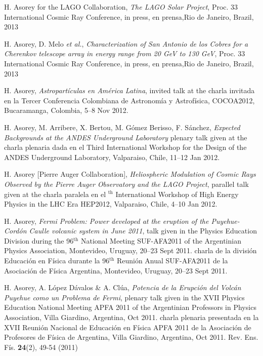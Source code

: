 \begin{etaremune}
\item {}H. Asorey for the LAGO Collaboration, {\emph{The LAGO Solar Project}}, \en Proc. 33 International Cosmic Ray Conference, \ifeng in press, \else en prensa,\fi  Rio de Janeiro, Brazil, 2013

\item {}H. Asorey, D. Melo {\emph{et al.}}, {\emph{Characterization of San Antonio de los Cobres for a Cherenkov telescope array in energy range from 20 GeV to 130 GeV}}, \en Proc. 33 International Cosmic Ray Conference, \ifeng in press, \else en prensa,\fi  Rio de Janeiro, Brazil, 2013

\item {} H. Asorey, {\emph{Astropartículas en América Latina}}, 
\ifeng
invited talk at the
\else
charla invitada en la 
\fi
Tercer Conferencia Colombiana de Astronomía y Astrofísica, COCOA2012, Bucaramanga, Colombia, 5--8 Nov 2012.

\item {} H. Asorey, M. Arribere, X. Bertou, M. Gómez Berisso, F. Sánchez,
{\emph{Expected Backgrounds at the ANDES Underground Laboratory}}
\ifeng
plenary talk given at the
\else
charla plenaria dada en el
\fi
Third International Workshop for the Design of the ANDES Underground Laboratory, Valparaiso, Chile, 11--12 Jan 2012.

\item {}H. Asorey [Pierre Auger Collaboration], {\emph{Heliospheric
Modulation of Cosmic Rays Observed by the Pierre Auger Observatory and the LAGO
Project}}, 
\ifeng
parallel talk given at the 
\else
charla paralela en el 
$^{\mathrm{th}}$ International Workshop of High Energy Physics in the LHC Era HEP2012, Valparaiso, Chile, 4--10 Jan 2012.

\item {}H. Asorey, {\emph{Fermi Problem: Power developed at the eruption of the Puyehue-Cordón Caulle volcanic system in June 2011}}, 
\ifeng
talk given in the Physics Education Division during the 96$^{\mathrm{th}}$ National Meeting SUF-AFA2011 of the Argentinian Physics Association, Montevideo, Uruguay, 20--23 Sept 2011.
\else
charla de la división Educación en Física durante la 96$^{\mathrm{th}}$ Reunión Anual SUF-AFA2011 de la Asociación de Física Argentina, Montevideo, Uruguay, 20--23 Sept 2011.
\fi

\item {}H. Asorey, A. López Dávalos \& A. Clúa, {\emph{Potencia de la Erupción del Volcán Puyehue como un Problema de Fermi}},
\ifeng
plenary talk given in the XVII Physics Education National Meeting APFA 2011 of the Argentinian Professors in Physics Association, Villa Giardino, Argentina, Oct 2011.
\else
charla plenaria presentada en la XVII Reunión Nacional de Educación en Física APFA 2011 de la Asociación de Profesores de Física de Argentina, Villa Giardino, Argentina, Oct 2011.
\fi
Rev. Ens. Fís. {\bf{24}}(2), 49-54 (2011)


\end{etaremune}

